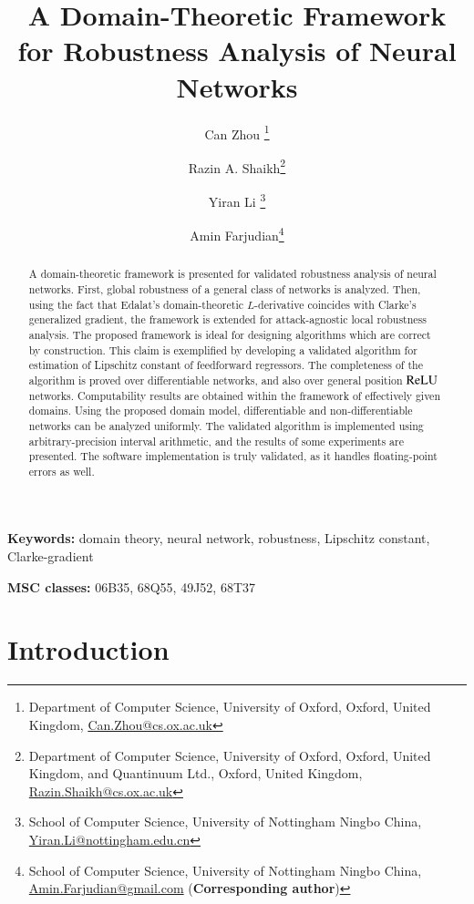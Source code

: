 \documentclass[11pt,times]{article}
\title{\textbf{A Domain-Theoretic Framework for Robustness Analysis of Neural
  Networks}}
\author{Can Zhou \thanks{Department of Computer Science, University of
    Oxford, Oxford, United Kingdom,
    \href{mailto:Can.Zhou@cs.ox.ac.uk}{Can.Zhou@cs.ox.ac.uk}} \and
  Razin A. Shaikh\thanks{Department of Computer Science, University of
    Oxford, Oxford, United Kingdom, and Quantinuum Ltd., Oxford,
    United Kingdom,
    \href{mailto:Razin.Shaikh@cs.ox.ac.uk}{Razin.Shaikh@cs.ox.ac.uk}}
  \and Yiran Li \thanks{School of Computer Science, University of
    Nottingham Ningbo China,
    \href{mailto:Yiran.Li@nottingham.edu.cn}{Yiran.Li@nottingham.edu.cn}}
  \and Amin Farjudian\thanks{School of Computer Science, University of
    Nottingham Ningbo China,
    \href{mailto:Amin.Farjudian@gmail.com}{Amin.Farjudian@gmail.com}
    (\textbf{Corresponding author})}}
\date{}
\begin{document}
\maketitle


\begin{abstract}

  A domain-theoretic framework is presented for validated robustness
  analysis of neural networks. First, global robustness of a general
  class of networks is analyzed. Then, using the fact that Edalat's
  domain-theoretic $L$-derivative coincides with Clarke's generalized
  gradient, the framework is extended for attack-agnostic local
  robustness analysis. The proposed framework is ideal for designing
  algorithms which are correct by construction. This claim is
  exemplified by developing a validated algorithm for estimation of
  Lipschitz constant of feedforward regressors. The completeness of
  the algorithm is proved over differentiable networks, and also over
  general position $\operatorname{\mathrm{ReLU}}$ networks. Computability results are
  obtained within the framework of effectively given domains. Using
  the proposed domain model, differentiable and non-differentiable
  networks can be analyzed uniformly. The validated algorithm is
  implemented using arbitrary-precision interval arithmetic, and the
  results of some experiments are presented. The software
  implementation is truly validated, as it handles floating-point
  errors as well.
 
  
\end{abstract}


\noindent
\textbf{Keywords:} domain theory, neural network, robustness,
Lipschitz constant, Clarke-gradient

\noindent
\textbf{MSC classes:} 06B35, 68Q55, 49J52, 68T37




\section{Introduction}
\label{sec:intro}
\end{document}
